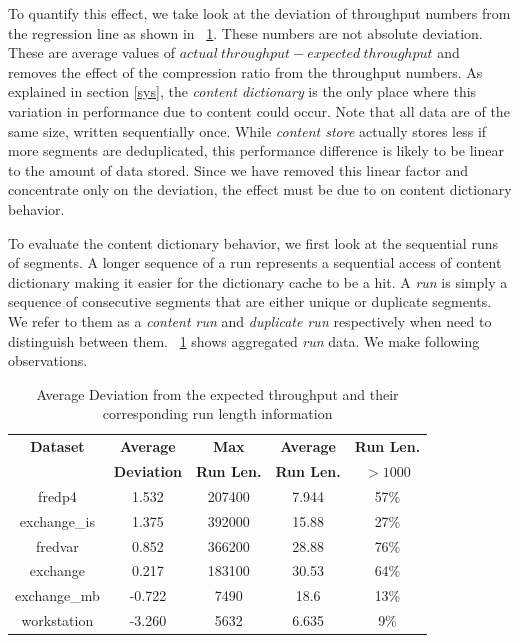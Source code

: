 To quantify this effect, we take look at the deviation of throughput numbers from the regression line as shown in \tablename~\ref{dev}. These numbers are not absolute deviation. These are average values of $actual\ throughput - expected\ throughput$ and removes the effect of the compression ratio from the throughput numbers. As explained in section \ref{sys}, the \emph{content dictionary} is the only place where this variation in performance due to content could occur. Note that all data are of the same size, written sequentially once. While \emph{content store} actually stores less if more segments are deduplicated, this performance difference is likely to be linear to the amount of data stored. Since we have removed this linear factor and concentrate only on the deviation, the effect must be due to on content dictionary behavior.

To evaluate the content dictionary behavior, we first look at the sequential runs of segments. A longer sequence of a run represents a sequential access of content dictionary making it easier for the dictionary cache to be a hit. A \emph{run} is simply a sequence of consecutive segments that are either unique or duplicate segments. We refer to them as a \emph{content run} and \emph{duplicate run} respectively when need to distinguish between them. \tablename~\ref{dev} shows aggregated \emph{run} data. We make following observations.

\begin{table}[!t]
\centering
\begin{tabular}{c||c c c c}
\hline
\bfseries Dataset 	&\bfseries Average	&\bfseries Max		&\bfseries Average	&\bfseries Run Len.	\\
 			&\bfseries Deviation 	&\bfseries Run Len.	&\bfseries Run Len.	&\bfseries $> 1000$	\\		
\hline\hline
fredp4		&1.532			&207400			&7.944			&57\%			\\
exchange\_is	&1.375			&392000			&15.88			&27\%			\\
fredvar		&0.852			&366200			&28.88			&76\%			\\
exchange 		&0.217			&183100			&30.53			&64\%			\\
exchange\_mb 	&-0.722			&7490			&18.6				&13\%			\\
workstation		&-3.260			&5632			&6.635			&9\%				\\			
\hline
\end{tabular}
\captionsetup{format=myformat}
\caption{Average Deviation from the expected throughput and their corresponding run length information}
\label{dev}
\end{table}


